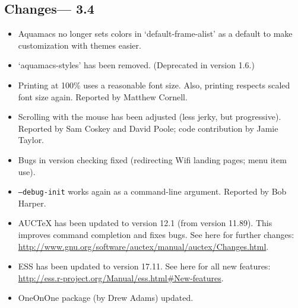 \subsection{Changes--- 3.4}
\begin{itemize}
\item Aquamacs no longer sets colors in `default-frame-alist' as a default to
  make customization with themes easier.
\item `aquamacs-styles' has been removed.  (Deprecated in version 1.6.)
\item Printing at 100\% uses a reasonable font size.  Also, printing respects scaled font size again.
Reported by Matthew Cornell.
\item Scrolling with the mouse has been adjusted (less jerky, but progressive).  Reported by Sam Coskey and David Poole;
  code contribution by Jamie Taylor.
\item Bugs in version checking fixed (redirecting Wifi landing pages; menu item use).
\item {\tt --debug-init} works again as a command-line argument.  Reported by Bob Harper.
\item AUCTeX has been updated to version 12.1 (from version 11.89).  This improves command completion and fixes bugs.  See here for further changes:  \url{http://www.gnu.org/software/auctex/manual/auctex/Changes.html}.
  \item ESS has been updated to version 17.11.  See here for all new features: \url{http://ess.r-project.org/Manual/ess.html#New-features}.
\item OneOnOne package (by Drew Adams) updated.
\end{itemize}


